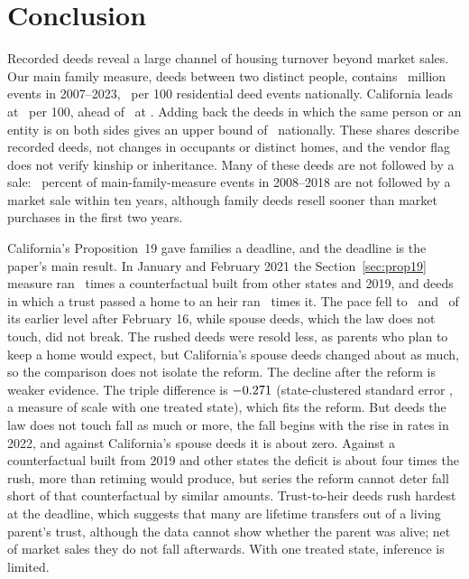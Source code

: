 \section{Conclusion}\label{sec:conclusion}

Recorded deeds reveal a large channel of housing turnover beyond market sales. Our main family measure, deeds between two distinct people, contains \DeedFamilyMillion\ million events in 2007--2023, \DeedNationalShare\ per 100 residential deed events nationally. California leads at \DeedCAShare\ per 100, ahead of \SIIIRunnerUpState\ at \SIIIRunnerUpShare. Adding back the deeds in which the same person or an entity is on both sides gives an upper bound of \DeedInclNationalShare\ nationally. These shares describe recorded deeds, not changes in occupants or distinct homes, and the vendor flag does not verify kinship or inheritance. Many of these deeds are not followed by a sale: \FamilyRetainedTen\ percent of main-family-measure events in 2008--2018 are not followed by a market sale within ten years, although family deeds resell sooner than market purchases in the first two years.

California's Proposition~19 gave families a deadline, and the deadline is the paper's main result. In January and February 2021 the Section~\ref{sec:prop19} measure ran \SIVMainJanFeb\ times a counterfactual built from other states and 2019, and deeds in which a trust passed a home to an heir ran \SIVHeirJanFeb\ times it. The pace fell to \SIVMainDeadlineSign\ and \SIVHeirDeadlineSign\ of its earlier level after February 16, while spouse deeds, which the law does not touch, did not break. The rushed deeds were resold less, as parents who plan to keep a home would expect, but California's spouse deeds changed about as much, so the comparison does not isolate the reform. The decline after the reform is weaker evidence. The triple difference is $-0.271$ (state-clustered standard error \SIVMainDDDSE, a measure of scale with one treated state), which fits the reform. But deeds the law does not touch fall as much or more, the fall begins with the rise in rates in 2022, and against California's spouse deeds it is about zero. Against a counterfactual built from 2019 and other states the deficit is about four times the rush, more than retiming would produce, but series the reform cannot deter fall short of that counterfactual by similar amounts. Trust-to-heir deeds rush hardest at the deadline, which suggests that many are lifetime transfers out of a living parent's trust, although the data cannot show whether the parent was alive; net of market sales they do not fall afterwards. With one treated state, inference is limited.


